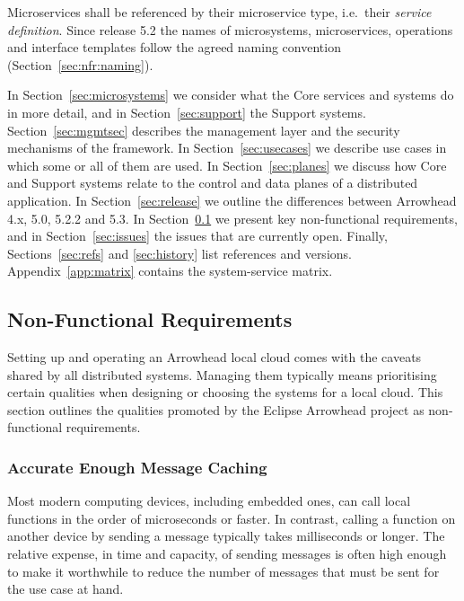 \documentclass[a4paper]{arrowhead}
\begin{document}
Microservices shall be referenced by their microservice type, i.e.\ their \emph{service
definition}. Since release 5.2 the names of microsystems, microservices, operations and
interface templates follow the agreed naming convention \cite{naming2}
(Section~\ref{sec:nfr:naming}).

In Section~\ref{sec:microsystems} we consider what the Core services and systems do in more
detail, and in Section~\ref{sec:support} the Support systems. Section~\ref{sec:mgmtsec}
describes the management layer and the security mechanisms of the framework. In
Section~\ref{sec:usecases} we
describe use cases in which some or all of them are used. In Section~\ref{sec:planes} we discuss
how Core and Support systems relate to the control and data planes of a distributed application.
In Section~\ref{sec:release} we outline the differences between
Arrowhead 4.x, 5.0, 5.2.2 and 5.3. In
Section~\ref{sec:nfr} we present key non-functional requirements, and in
Section~\ref{sec:issues} the issues that are currently open. Finally,
Sections~\ref{sec:refs} and \ref{sec:history} list references and versions.
Appendix~\ref{app:matrix} contains the system-service matrix.

\newpage

\subsection{Non-Functional Requirements}
\label{sec:nfr}

Setting up and operating an Arrowhead local cloud comes with the caveats shared by all
distributed systems. Managing them typically means prioritising certain qualities when
designing or choosing the systems for a local cloud. This section outlines the qualities
promoted by the Eclipse Arrowhead project as non-functional requirements.

\subsubsection{Accurate Enough Message Caching}
\label{sec:nfr:cache}
Most modern computing devices, including embedded ones, can call local functions in the order of
microseconds or faster. In contrast, calling a function on another device by sending a message
typically takes milliseconds or longer. The relative expense, in time and capacity, of sending
messages is often high enough to make it worthwhile to reduce the number of messages that must be
sent for the use case at hand.
\end{document}
